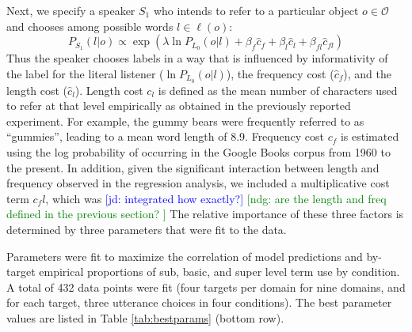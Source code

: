\documentclass[10pt,letterpaper]{article}
\newcommand{\red}[1]{\textcolor{Red}{#1}}
\newcommand{\ndg}[1]{\textcolor{Green}{[ndg: #1]}}
\newcommand{\jd}[1]{\textcolor{Blue}{[jd: #1]}}
\newcommand{\denote}[1]{\mbox{ $[\![ #1 ]\!]$}}
\newcommand{\tableref}[1]{Table \ref{#1}}
\begin{document}
Next, we specify a speaker $S_1$ who intends to refer to a particular object $o \in \mathcal{O}$ and chooses among possible words $l \in \ell(o)$: 
$$P_{S_1}(l | o) \propto \exp(\lambda \ln P_{L_0}(o | l) + \beta_f \hat{c}_f  + \beta_l \hat{c}_l + \beta_{fl} \hat{c}_{fl} )$$
Thus the speaker chooses labels in a way that is influenced by informativity of the label for the literal listener ($\ln P_{L_0}(o | l)$), the frequency cost ($\hat{c}_f$), and the length cost ($\hat{c}_l$).
Length cost $c_l$ is defined as the mean number of characters used to refer at that level empirically as obtained in the previously reported experiment. For example, the gummy bears were frequently referred to as ``gummies'', leading to a mean word length of 8.9. Frequency cost $c_f$ is estimated using the log probability of occurring in the Google Books corpus from 1960 to the present. In addition, given the significant interaction between length and frequency observed in the regression analysis, we included a multiplicative cost term $c_fl$, which was \jd{integrated how exactly?} \ndg{are the length and freq defined in the previous section? }
The relative importance of these three factors is determined by three parameters that were fit to the data.


Parameters were fit to maximize the correlation of model predictions and by-target empirical proportions of sub, basic, and super level term use by condition. A total of 432 data points were fit (four targets per domain for nine domains, and for each target, three utterance choices in four conditions). The best parameter values are listed in \tableref{tab:bestparams} (bottom row). 
\end{document}
